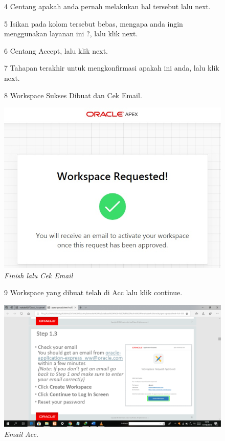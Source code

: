 \begin{enumerate}
\begin{figure}[!htbp]
        
\item[4]Centang apakah anda pernah melakukan hal tersebut lalu next.  

      
\item[5]Isikan pada kolom tersebut bebas, mengapa anda ingin menggunakan layanan ini ?, lalu klik next.

 
\item[6] Centang Accept, lalu klik next.


\item[7] Tahapan terakhir untuk mengkonfirmasi apakah ini anda, lalu klik next.

   
\item[8] Workspace Sukses Dibuat dan Cek Email.

    \begin{center}
\includegraphics[scale=0.5]{figures/pict(3).jpg}
    \caption{\textit{Finish lalu Cek Email}}
        \end{center}
\label{gambar}
\end{figure}

\begin{figure}
\item[9] Workspace yang dibuat telah di Acc lalu klik continue.

    \begin{center}
\includegraphics[scale=0.2]{figures/pict(4).png}
    \caption{\textit{Email Acc.}}
        \end{center}
\label{gambar}
\end{figure}


\end{enumerate}
